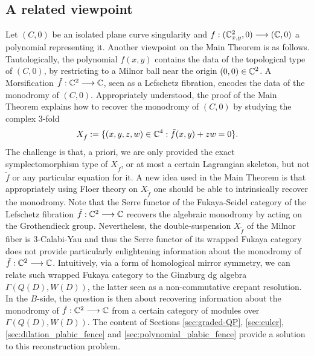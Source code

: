 
\subsection{A related viewpoint}\label{ssec:geometric} Let $(C,0)$ be an isolated plane curve singularity and $f:(\mathbb C^2_{x,y},0)\longrightarrow(\mathbb C,0)$ a polynomial representing it. Another viewpoint on the Main Theorem is as follows. Tautologically, the polynomial $f(x,y)$ contains the data of the topological type of $(C,0)$, by restricting to a Milnor ball near the origin $(0,0)\in\mathbb C^2$. A Morsification $\tilde{f}:\mathbb C^2\longrightarrow\mathbb C$, seen as a Lefschetz fibration, encodes the data of the monodromy of $(C,0)$. Appropriately understood, the proof of the Main Theorem explains how to recover the monodromy of $(C,0)$ by studying the complex 3-fold
$$X_{\tilde{f}}:=\{(x,y,z,w)\in\mathbb C^4: \tilde{f}(x,y)+zw=0\}.$$
The challenge is that, a priori, we are only provided the exact symplectomorphism type of $X_{\tilde{f}}$, or at most a certain Lagrangian skeleton, but not $\tilde{f}$ or any particular equation for it. A new idea used in the Main Theorem is that appropriately using Floer theory on $X_{\tilde{f}}$ one should be able to intrinsically recover the monodromy. Note that the Serre functor of the Fukaya-Seidel category of the Lefschetz fibration $\tilde{f}:\mathbb C^2\longrightarrow\mathbb C$ recovers the algebraic monodromy by acting on the Grothendieck group. Nevertheless, the double-suspension $X_{\tilde{f}}$ of the Milnor fiber is 3-Calabi-Yau and thus the Serre functor of its wrapped Fukaya category does not provide particularly enlightening information about the monodromy of $\tilde{f}:\mathbb C^2\longrightarrow\mathbb C$. Intuitively, via a form of homological mirror symmetry, we can relate such wrapped Fukaya category to the Ginzburg dg algebra $\Gamma(Q(D),W(D))$, the latter seen as a non-commutative crepant resolution. In the $B$-side, the question is then about recovering information about the monodromy of $\tilde{f}:\mathbb C^2\longrightarrow\mathbb C$ from a certain category of modules over $\Gamma(Q(D),W(D))$. The content of Sections \ref{sec:graded-QP}, \ref{sec:euler}, \ref{sec:dilation_plabic_fence} and \ref{sec:polynomial_plabic_fence} provide a solution to this reconstruction problem.

